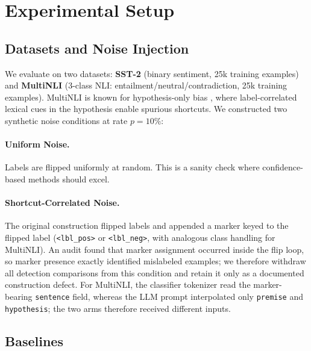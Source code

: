 \documentclass[letterpaper]{article}
\begin{document}
\section{Experimental Setup}
\label{sec:experiments}

\subsection{Datasets and Noise Injection}

We evaluate on two datasets: \textbf{SST-2} \citep{socher2013recursive} (binary sentiment, 25k training examples) and \textbf{MultiNLI} \citep{williams2018multinli} (3-class NLI: entailment/neutral/contradiction, 25k training examples).
MultiNLI is known for hypothesis-only bias \citep{poliak2018hypothesis}, where label-correlated lexical cues in the hypothesis enable spurious shortcuts.
We constructed two synthetic noise conditions at rate $p=10\%$:

\paragraph{Uniform Noise.}
Labels are flipped uniformly at random.
This is a sanity check where confidence-based methods should excel.

\paragraph{Shortcut-Correlated Noise.}
The original construction flipped labels and appended a marker keyed to the flipped label (\texttt{<lbl\_pos>} or \texttt{<lbl\_neg>}, with analogous class handling for MultiNLI).
An audit found that marker assignment occurred inside the flip loop, so marker presence exactly identified mislabeled examples; we therefore withdraw all detection comparisons from this condition and retain it only as a documented construction defect.
For MultiNLI, the classifier tokenizer read the marker-bearing \texttt{sentence} field, whereas the LLM prompt interpolated only \texttt{premise} and \texttt{hypothesis}; the two arms therefore received different inputs.

\subsection{Baselines}
\end{document}
